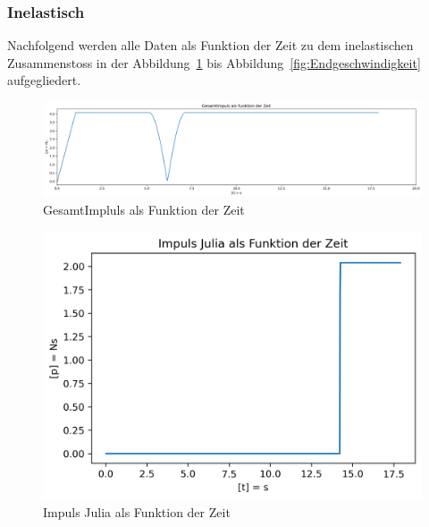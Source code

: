 \documentclass[../main.tex]{subfiles}
\begin{document}
    \newpage
    \subsubsection{Inelastisch}
    Nachfolgend werden alle Daten als Funktion der Zeit zu dem inelastischen Zusammenstoss in der
    Abbildung~\ref{fig:gesamtImpluls} bis Abbildung~\ref{fig:Endgeschwindigkeit}
    aufgegliedert.

    \begin{figure}[H]
        \begin{center}
            \centerline{\includegraphics[width=155mm]{./images/Inelastisch/GesamtImpluls}}
            \caption{GesamtImpluls als Funktion der Zeit}
            \label{fig:gesamtImpluls}
        \end{center}
    \end{figure}

    \begin{figure}[H]
        \begin{center}
            \centerline{\includegraphics[width=155mm]{./images/Inelastisch/ImpulsJulia}}
            \caption{Impuls Julia als Funktion der Zeit}
            \label{fig:ImpulsJulia}
        \end{center}
    \end{figure}
\end{document}
